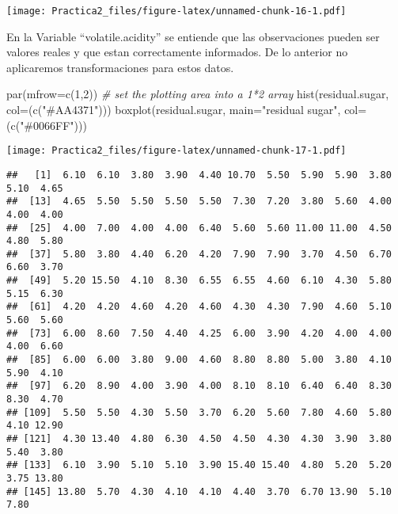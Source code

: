 \documentclass[
]{article}
\newenvironment{Shaded}{\begin{snugshade}}{\end{snugshade}}
\newcommand{\AttributeTok}[1]{\textcolor[rgb]{0.77,0.63,0.00}{#1}}
\newcommand{\CommentTok}[1]{\textcolor[rgb]{0.56,0.35,0.01}{\textit{#1}}}
\newcommand{\DecValTok}[1]{\textcolor[rgb]{0.00,0.00,0.81}{#1}}
\newcommand{\FunctionTok}[1]{\textcolor[rgb]{0.00,0.00,0.00}{#1}}
\newcommand{\NormalTok}[1]{#1}
\newcommand{\SpecialCharTok}[1]{\textcolor[rgb]{0.00,0.00,0.00}{#1}}
\newcommand{\StringTok}[1]{\textcolor[rgb]{0.31,0.60,0.02}{#1}}
\begin{document}
\texttt{[image: Practica2\_files/figure-latex/unnamed-chunk-16-1.pdf]}

En la Variable ``volatile.acidity'' se entiende que las observaciones
pueden ser valores reales y que estan correctamente informados. De lo
anterior no aplicaremos transformaciones para estos datos.

\begin{Shaded}
\begin{Highlighting}[]
\FunctionTok{par}\NormalTok{(}\AttributeTok{mfrow=}\FunctionTok{c}\NormalTok{(}\DecValTok{1}\NormalTok{,}\DecValTok{2}\NormalTok{))    }\CommentTok{\# set the plotting area into a 1*2 array}
\FunctionTok{hist}\NormalTok{(residual.sugar, }\AttributeTok{col=}\NormalTok{(}\FunctionTok{c}\NormalTok{(}\StringTok{"\#AA4371"}\NormalTok{)))}
\FunctionTok{boxplot}\NormalTok{(residual.sugar, }\AttributeTok{main=}\StringTok{"residual sugar"}\NormalTok{, }\AttributeTok{col=}\NormalTok{(}\FunctionTok{c}\NormalTok{(}\StringTok{"\#0066FF"}\NormalTok{)))}
\end{Highlighting}
\end{Shaded}

\texttt{[image: Practica2\_files/figure-latex/unnamed-chunk-17-1.pdf]}

\begin{Shaded}
\end{Shaded}

\begin{verbatim}
##   [1]  6.10  6.10  3.80  3.90  4.40 10.70  5.50  5.90  5.90  3.80  5.10  4.65
##  [13]  4.65  5.50  5.50  5.50  5.50  7.30  7.20  3.80  5.60  4.00  4.00  4.00
##  [25]  4.00  7.00  4.00  4.00  6.40  5.60  5.60 11.00 11.00  4.50  4.80  5.80
##  [37]  5.80  3.80  4.40  6.20  4.20  7.90  7.90  3.70  4.50  6.70  6.60  3.70
##  [49]  5.20 15.50  4.10  8.30  6.55  6.55  4.60  6.10  4.30  5.80  5.15  6.30
##  [61]  4.20  4.20  4.60  4.20  4.60  4.30  4.30  7.90  4.60  5.10  5.60  5.60
##  [73]  6.00  8.60  7.50  4.40  4.25  6.00  3.90  4.20  4.00  4.00  4.00  6.60
##  [85]  6.00  6.00  3.80  9.00  4.60  8.80  8.80  5.00  3.80  4.10  5.90  4.10
##  [97]  6.20  8.90  4.00  3.90  4.00  8.10  8.10  6.40  6.40  8.30  8.30  4.70
## [109]  5.50  5.50  4.30  5.50  3.70  6.20  5.60  7.80  4.60  5.80  4.10 12.90
## [121]  4.30 13.40  4.80  6.30  4.50  4.50  4.30  4.30  3.90  3.80  5.40  3.80
## [133]  6.10  3.90  5.10  5.10  3.90 15.40 15.40  4.80  5.20  5.20  3.75 13.80
## [145] 13.80  5.70  4.30  4.10  4.10  4.40  3.70  6.70 13.90  5.10  7.80
\end{verbatim}
\end{document}
